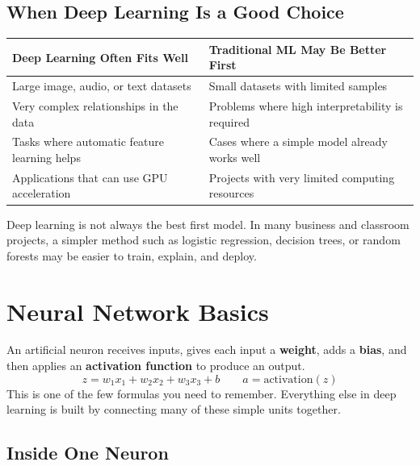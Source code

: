 \documentclass[11pt,a4paper]{article}
\begin{document}
\subsection{When Deep Learning Is a Good Choice}

\begin{center}
\begin{tabular}{@{}p{6.2cm}p{6.2cm}@{}}
\toprule
\textbf{Deep Learning Often Fits Well} & \textbf{Traditional ML May Be Better First} \\
\midrule
Large image, audio, or text datasets & Small datasets with limited samples \\
Very complex relationships in the data & Problems where high interpretability is required \\
Tasks where automatic feature learning helps & Cases where a simple model already works well \\
Applications that can use GPU acceleration & Projects with very limited computing resources \\
\bottomrule
\end{tabular}
\end{center}

\begin{alertbox}
Deep learning is not always the best first model. In many business and classroom projects, a simpler method such as logistic regression, decision trees, or random forests may be easier to train, explain, and deploy.
\end{alertbox}

\section{Neural Network Basics}

\begin{definitionbox}
An artificial neuron receives inputs, gives each input a \textbf{weight}, adds a \textbf{bias}, and then applies an \textbf{activation function} to produce an output.
\[
z = w_1x_1 + w_2x_2 + w_3x_3 + b
\qquad
a = \text{activation}(z)
\]
This is one of the few formulas you need to remember. Everything else in deep learning is built by connecting many of these simple units together.
\end{definitionbox}

\subsection{Inside One Neuron}
\end{document}
